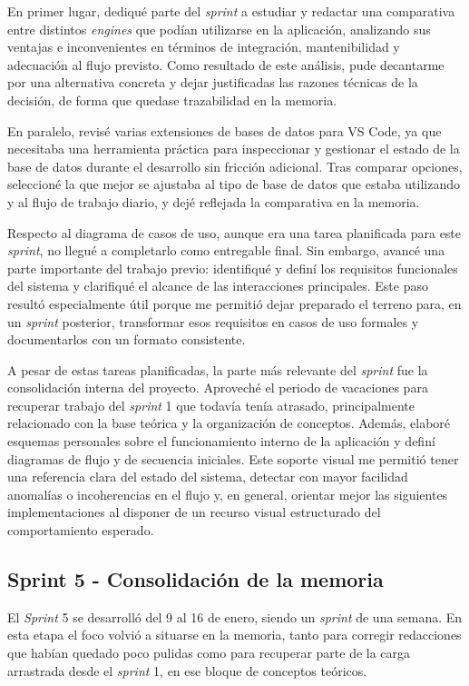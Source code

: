 En primer lugar, dediqué parte del \textit{sprint} a estudiar y redactar una comparativa entre distintos \textit{engines} que podían utilizarse en la aplicación, analizando sus ventajas e inconvenientes en términos de integración, mantenibilidad y adecuación al flujo previsto. Como resultado de este análisis, pude decantarme por una alternativa concreta y dejar justificadas las razones técnicas de la decisión, de forma que quedase trazabilidad en la memoria.

En paralelo, revisé varias extensiones de bases de datos para VS Code, ya que necesitaba una herramienta práctica para inspeccionar y gestionar el estado de la base de datos durante el desarrollo sin fricción adicional. Tras comparar opciones, seleccioné la que mejor se ajustaba al tipo de base de datos que estaba utilizando y al flujo de trabajo diario, y dejé reflejada la comparativa en la memoria.

Respecto al diagrama de casos de uso, aunque era una tarea planificada para este \textit{sprint}, no llegué a completarlo como entregable final. Sin embargo, avancé una parte importante del trabajo previo: identifiqué y definí los requisitos funcionales del sistema y clarifiqué el alcance de las interacciones principales. Este paso resultó especialmente útil porque me permitió dejar preparado el terreno para, en un \textit{sprint} posterior, transformar esos requisitos en casos de uso formales y documentarlos con un formato consistente.

A pesar de estas tareas planificadas, la parte más relevante del \textit{sprint} fue la consolidación interna del proyecto. Aproveché el periodo de vacaciones para recuperar trabajo del \textit{sprint} 1 que todavía tenía atrasado, principalmente relacionado con la base teórica y la organización de conceptos. Además, elaboré esquemas personales sobre el funcionamiento interno de la aplicación y definí diagramas de flujo y de secuencia iniciales. Este soporte visual me permitió tener una referencia clara del estado del sistema, detectar con mayor facilidad anomalías o incoherencias en el flujo y, en general, orientar mejor las siguientes implementaciones al disponer de un recurso visual estructurado del comportamiento esperado.

\subsection{Sprint 5 - Consolidación de la memoria}
El \textit{Sprint} 5 se desarrolló del 9 al 16 de enero, siendo un \textit{sprint} de una semana. En esta etapa el foco volvió a situarse en la memoria, tanto para corregir redacciones que habían quedado poco pulidas como para recuperar parte de la carga arrastrada desde el \textit{sprint} 1, en ese bloque de conceptos teóricos.

